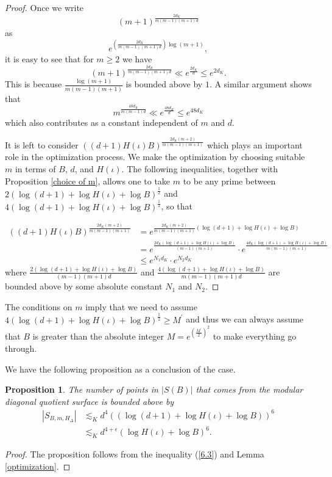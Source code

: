 \documentclass[12pt]{amsart}
\newtheorem{prop}[thm]{Proposition}
\theoremstyle{definition}
\theoremstyle{remark}
\numberwithin{equation}{section}
\begin{document}
  \begin{proof}
  Once we write $$(m+1)^{\frac{2d_{K}}{m(m-1)(m+1) d}}$$ as $$e^{(\frac{2d_{K}}{m(m-1)(m+1) d})\log (m+1)},$$ it is easy to see that for $m \ge 2$ we have
$$(m+1)^{\frac{2d_{K}}{m(m-1)(m+1) d}} \ll e^{\frac{2d_{K}}{d}} \le e^{2d_{K}}.$$
This is because $\frac{\log (m+1)}{m(m-1)(m+1)} $ is bounded above by $1$.
A similar argument shows that
$$m^{\frac{48d_{K}}{m(m-1)d}} \ll e^{\frac{48d_{K}}{d}} \le e^{48d_{K}}$$ which also contributes as a constant independent of $m$ and $d$.

It is left to consider $((d+1)H(\iota)B)^{\frac{2d_{K}(m+2)}{m(m-1)(m+1)}}$ which plays an important role in the optimization process. We make the optimization by choosing suitable $m$ in terms of $B$, $d$, and $H(\iota)$. The following inequalities, together with Proposition \ref{choice of m}, allows one to take $m$ to be any prime between $2(\log (d+1) + \log H(\iota) + \log B)^{\frac{1}{2}}$ and $4(\log (d+1) + \log H(\iota) + \log B)^{\frac{1}{2}}$, so that

\begin{align*}
((d+1)H(\iota)B)^{\frac{2d_{K}(m+2)}{m(m-1)(m+1)}} &=e^{{\frac{2d_{K}(m+2)}{m(m-1)(m+1)}}(\log (d+1) + \log H(\iota) + \log B)} \\
&= e^{\frac{2d_{K} (\log (d+1) + \log H(\iota) + \log B)}{(m-1)(m+1)}} \cdot e^{\frac{4d_{K} (\log (d+1) + \log H(\iota) + \log B)}{m(m-1)(m+1)}} \\
&\le e^{N_{1}d_{K}} \cdot e^{N_{2}d_{K}}
\end{align*}
where $\frac{2 (\log (d+1) + \log H(\iota) + \log B)}{(m-1)(m+1)d}$ and $\frac{4 (\log (d+1) + \log H(\iota) + \log B)}{m(m-1)(m+1)d}$ are bounded above by some absolute constant $N_{1}$ and $N_{2}$. 

  \end{proof}
  
 The conditions on $m$ imply that we need to assume $4(\log (d+1) + \log H(\iota) + \log B)^{\frac{1}{2}} \ge M^{\prime}$ and thus we can always assume that $B$ is greater than the absolute integer $M=e^{(\frac{M^{\prime}}{2})^2}$ to make everything go through.
 
We have the following proposition as a conclusion of the case.
\begin{prop}\label{1}
The number of points in $|S(B)|$ that comes from the modular diagonal quotient surface is bounded above by 
\begin{align*}
	|S_{B, m, H_{\Delta}}| &\lesssim_{K} d^{4}((\log (d+1) + \log H(\iota) + \log B))^{6} \\
	&\lesssim_{K} d^{4+\epsilon}( \log H(\iota) + \log B)^{6} .
\end{align*} 
	
\end{prop}  
  \begin{proof} 
  The proposition follows from the inequality (\ref{6.3}) and Lemma \ref{optimization}.
\end{proof}
\end{document}

